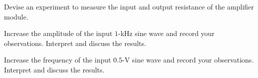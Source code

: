 \documentclass[11pt]{article}
\begin{document}
\begin{question}
    \begin{subquestion}{Devise an experiment to measure the input and output resistance of the amplifier module.}
        \answer{}
    \end{subquestion}

    \begin{subquestion}{Increase the amplitude of the input $1$-kHz sine wave and record your observations. Interpret and discuss the results.}
        \answer{}
    \end{subquestion}

    \begin{subquestion}{Increase the frequency of the input $0.5$-V sine wave and record your observations. Interpret and discuss the results.}
        \answer{}
    \end{subquestion}

\end{question}


\end{document}
